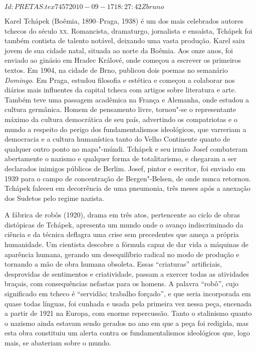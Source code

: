 \SVN $Id: PRETAS.tex 7457 2010-09-17 18:27:42Z bruno $
\begin{resumopage}

\item[Karel Tchápek] (Boêmia, 1890--Praga, 1938) é um dos mais celebrados autores tchecos do século \textsc{xx}. Romancista, dramaturgo, 
jornalista e ensaísta, Tchápek foi também contista de talento notável, deixando uma vasta produção. Karel saiu jovem de sua cidade natal, 
situada ao norte da Boêmia. Aos onze anos, foi enviado ao ginásio em Hradec Králové, onde começou a escrever os primeiros textos. 
Em 1904, na cidade de Brno, publicou dois poemas no semanário \textit{Domingo}. Em Praga, estudou filosofia e estética e começou a 
colaborar nos diários mais influentes da capital tcheca com artigos sobre literatura e arte. Também teve uma passagem acadêmica na 
França e Alemanha, onde estudou a cultura germânica. Homem de pensamento livre, tornou"-se o representante 
máximo da cultura democrática de seu país, advertindo os compatriotas e o mundo a respeito do perigo dos fundamentalismos
ideológicos, que varreriam a democracia e a cultura humanística tanto do Velho
Continente quanto de qualquer outro ponto no mapa"-múndi. Tchápek e seu irmão Josef combateram abertamente o nazismo e 
qualquer forma de totalitarismo, e chegaram a ser  declarados inimigos públicos de Berlim. Josef, pintor e escritor, foi enviado em 1939 
para o campo de concentração de Bergen"-Belsen,  de onde nunca retornou.  Tchápek faleceu em decorrência de uma pneumonia,  
três meses após a anexação dos Sudetos pelo regime nazista.

\item[A fábrica de robôs] (1920), drama em três atos, pertencente ao ciclo de obras distópicas de Tchápek,  
apresenta um mundo onde o avanço indiscriminado da ciência e da técnica deflagra uma crise sem precedentes 
que ameça a própria humanidade. Um cientista descobre a fórmula capaz de dar vida a máquinas de aparência humana,  
gerando um desequilíbrio radical no modo de produção e tornando
a mão de obra humana obsoleta. Essas ``criaturas'' artificiais, desprovidas de sentimentos e criatividade, 
passam a exercer todas as atividades braçais, com consequências nefastas para os homens.  A palavra ``robô'', 
cujo significado em tcheco é ``servidão; trabalho forçado'', 
e que seria incorporada em quase todas línguas, foi cunhada e usada pela primeira vez nessa peça, encenada a partir de 1921 na Europa, 
com enorme repercussão. Tanto o stalinismo quanto o nazismo ainda estavam sendo gerados
no ano em que a peça foi redigida, mas esta obra constituiu um alerta contra os fundamentalismos ideológicos 
que, logo mais, se abateriam sobre o mundo.
        

\end{resumopage}
